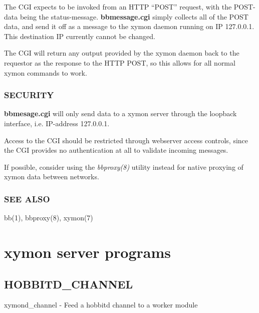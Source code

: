   The CGI expects to be invoked from an HTTP ``POST'' request, with
  the POST-data being the status-message. \textbf{bbmessage.cgi}
  simply collects all of the POST data, and send it off as a message
  to the xymon daemon running on IP 127.0.0.1. This destination IP
  currently cannot be changed. 



  The CGI will return any output provided by the xymon daemon back to
  the requestor as the response to the HTTP POST, so this allows for
  all normal xymon commands to work. 



 
\subsection{SECURITY}
\textbf{bbmesage.cgi} will only send data to a xymon server through
the loopback interface, i.e. IP-address 127.0.0.1. 


  Access to the CGI should be restricted through webserver access
  controls, since the CGI provides no authentication at all to
  validate incoming messages. 



  If possible, consider using the \emph{bbproxy(8)}
 utility instead for native proxying of xymon data between networks. 


 
\subsection{SEE ALSO}
bb(1), bbproxy(8), xymon(7) 


%
\chapter{xymon server programs}

%

\section{HOBBITD\_CHANNEL}

 xymond\_channel - Feed a hobbitd channel to a worker module 

